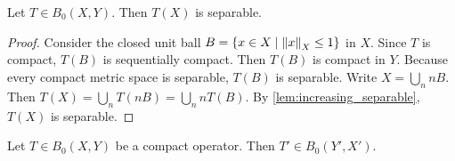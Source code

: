 \begin{theorem}\label{thm:cpt_op_separable}
    Let $T\in B_0(X,Y)$. Then $T(X)$ is separable.
\end{theorem}
\begin{proof}
    Consider the closed unit ball $B = \left\{ x\in X \;\middle\vert\; \left\lVert {x} \right\rVert_X\leq 1 \right\}$ 
    in $X$. Since $T$ is compact, $T(B)$ is sequentially compact. 
    Then $T(B)$ is compact in $Y$. Because every compact metric space 
    is separable, $T(B)$ is separable. Write $X = \bigcup_n nB$. 
    Then $T(X) = \bigcup_n T(nB) = \bigcup_n nT(B)$. By 
    \cref{lem:increasing_separable}, $T(X)$ is separable.
\end{proof}

\begin{theorem}
    Let $T\in B_0(X,Y)$ be a compact operator. Then $T'\in B_0(Y',X')$.
\end{theorem}
